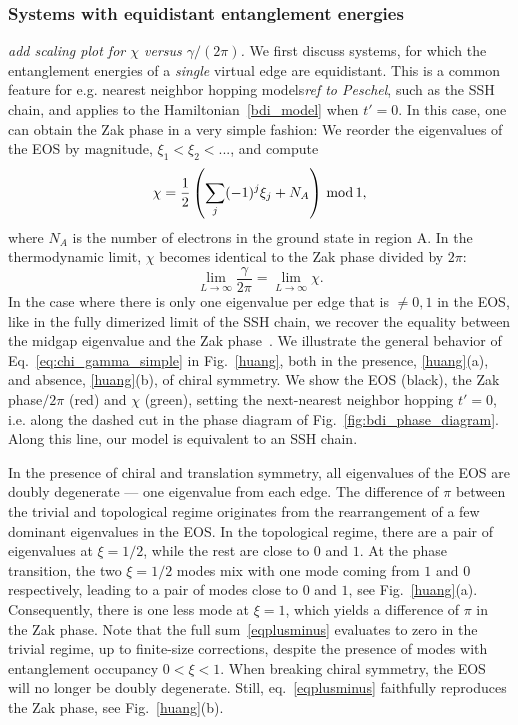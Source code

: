 \documentclass[twocolumn,amsmath,longbibliography,amssymb,superscriptaddress]{revtex4-1}
\newcommand{\mariac}[1]{{\it\color{cyan}#1}}
\begin{document}
\subsubsection{Systems with equidistant entanglement energies}
\mariac{add scaling plot for $\chi$ versus $\gamma/(2\pi)$. }
We first discuss systems, for which the entanglement energies of a \emph{single} virtual edge are equidistant. 
This is a common feature for e.g. nearest neighbor hopping models\mariac{ref to Peschel}, such as the SSH chain, and applies to the Hamiltonian~\eqref{bdi_model} when $t'=0$. 
In this case, one can obtain the Zak phase in a very simple fashion: We reorder the eigenvalues of the EOS by magnitude, $\xi_1 < \xi_2 < ...$, and compute
\begin{equation}
\chi = \frac{1}{2}\left(\sum_j (-1)^j \xi_j+N_A\right) \, {\rm mod} \, 1,
\label{eqplusminus}
\end{equation}
where $N_A$ is the number of electrons in the ground state in region A. 
In the thermodynamic limit, $\chi$ becomes identical to the Zak phase divided by $2\pi$:
\begin{equation}\label{eq:chi_gamma_simple}
\lim_{L \rightarrow \infty} \frac{\gamma}{2\pi} = \lim_{L \rightarrow \infty} \chi.
\end{equation}
In the case where there is only one eigenvalue per edge that is $\neq 0,1$ in  the EOS, like in the fully dimerized limit of the SSH chain, we recover the equality between the midgap eigenvalue and the Zak phase~\cite{Ryu2006}. 
We illustrate the general behavior of Eq.~\eqref{eq:chi_gamma_simple} in Fig.~\ref{huang}, both in the presence, \ref{huang}(a),  and absence, \ref{huang}(b),  of chiral symmetry. 
We show the EOS (black), the Zak phase$/2\pi$ (red) and $\chi$ (green), setting the next-nearest neighbor hopping $t'=0$, i.e.  along the dashed cut in the phase diagram of Fig.~\ref{fig:bdi_phase_diagram}. 
Along this line, our model is equivalent to an SSH chain. 

In the presence of chiral and translation symmetry, all eigenvalues of the EOS are doubly degenerate --- one eigenvalue from each edge. 
The difference of $\pi$ between the trivial and topological regime originates from the rearrangement of a few dominant eigenvalues in the EOS. 
In the topological regime, there are a pair of eigenvalues at $\xi=1/2$, while the rest are close to $0$ and $1$. 
At the phase transition, the two $\xi=1/2$ modes mix with one mode coming from $1$ and $0$ respectively, leading to a pair of modes close to $0$ and $1$, see Fig.~\ref{huang}(a). 
Consequently, there is one less mode at $\xi=1$, which yields a difference of $\pi$ in the Zak phase. 
Note that the full sum~\eqref{eqplusminus}  evaluates to zero in the trivial regime, up to finite-size corrections, despite the presence of modes with entanglement occupancy $0<\xi<1$. 
When breaking chiral symmetry, the EOS will no longer be doubly degenerate. 
Still, eq.~\eqref{eqplusminus} faithfully reproduces the Zak phase, see Fig.~\ref{huang}(b). 
\end{document}
